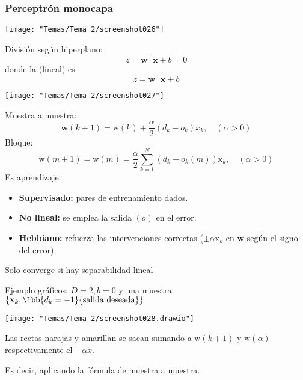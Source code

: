 \subsubsection{Perceptrón monocapa}
\begin{center}
	\texttt{[image: "Temas/Tema 2/screenshot026"]}
\end{center}
\begin{minipage}{0.5\textwidth}
	División según hiperplano: \[ z=\mathbf{w^\intercal x}+b=0 \]donde la  (lineal) es \[ z=\mathbf{w^\intercal x}+b \]
\end{minipage}\qquad\begin{minipage}{0.5\textwidth}
\begin{center}
	\texttt{[image: "Temas/Tema 2/screenshot027"]}
\end{center}
\end{minipage}
Muestra a muestra: \[ \mathbf{w}(k+1)=\mathrm{w}(k)+\dfrac{\alpha}{2}(d_k-o_k)x_k,\quad(\alpha>0) \]
Bloque: \[ \mathrm{w}(m+1)=\mathrm{w}(m)=\dfrac{\alpha}{2}\sum_{k=1}^{N}(d_k-o_k(m))\mathrm{x}_k,\quad(\alpha>0) \]
Es aprendizaje:
\begin{itemize}
	\item \textbf{Supervisado:} pares de entrenamiento dados.
	\item \textbf{No lineal:} se emplea la salida $(o)$ en el error.
	\item \textbf{Hebbiano:} refuerza las intervenciones correctas ($\pm\alpha\mathrm{x}_k$ en $\mathbf{w}$ según el signo del error).
\end{itemize}
Solo converge si hay separabilidad lineal

Ejemplo gráficos: $D=2,b=0$ y una muestra $\{\mathbf{x}_k,\lbb{d_k=-1}{\text{salida deseada}}\}$
\begin{center}
	\texttt{[image: "Temas/Tema 2/screenshot028.drawio"]}
\end{center}

Las rectas narajas y amarillan se sacan sumando a $\mathrm{w}(k+1)$ y $\mathrm{w}(\alpha)$ respectivamente el $-\alpha x$.

Es decir, aplicando la fórmula de muestra a muestra.
